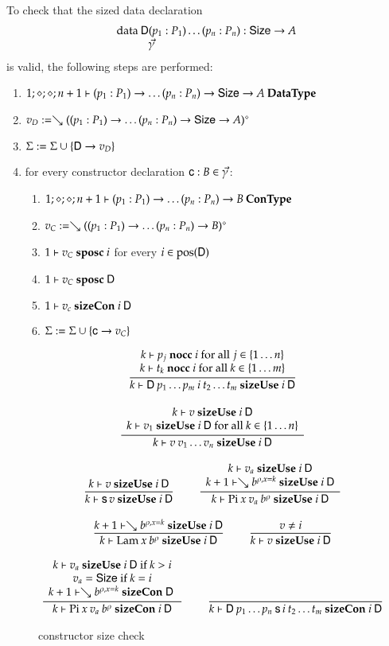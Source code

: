 To check that the sized data declaration
\[\begin{array}{l}
\data \DD ( p_1 : P_1) \ldots ( p_n : P_n) : \Size \ra A \\
\spcx \vec{\gamma}
\end{array}
\]
is valid, the following steps are performed: 
\begin{enumerate}
\item
$1;\diamond;\diamond;n+1\vdash(p_1 : P_1) \rightarrow \ldots (p_n : P_n) \rightarrow \mathsf{Size} \rightarrow A\:\mathbf{DataType}$
\item
$v_D := \searrow ((p_1 : P_1) \rightarrow \ldots (p_n : P_n) \rightarrow \mathsf{Size} \rightarrow A)^{\diamond}$
\item
$\mathrm{\Sigma} := \mathrm{\Sigma} \cup \{\mathsf{D} \rightarrow v_D\}$
\item
for every constructor declaration $\mathsf{c} : B  \in \vec{\gamma}$:
\begin{enumerate} 
\item
$1;\diamond;\diamond;n+1\vdash(p_1 : P_1) \rightarrow \ldots (p_n : P_n) \rightarrow B\:\mathbf{ConType}$
\item
$v_C := \searrow ((p_1 : P_1) \rightarrow \ldots (p_n : P_n) \rightarrow B)^{\diamond}$
\item
$1\vdash v_C\mbox{ \textbf{sposc} }i$ for every $i \in \mbox{pos}(\mathsf{D}) $ 
\item
$1\vdash v_C\mbox{ \textbf{sposc} }\mathsf{D}$
\item
$1\vdash v_c\mbox{ \textbf{sizeCon} }i\:\mathsf{D}$
\item
$\mathrm{\Sigma} := \mathrm{\Sigma} \cup \{\mathsf{c} \rightarrow v_C\}$
\end{enumerate}
\end{enumerate}

\begin{figure}[p]
\begin{gather*}
\ \dfrac{\begin{array}[b]{c}k\vdash p_j\mbox{ \textbf{nocc} }i \mbox { for all } j \in \{ 1 \ldots n\}\\k\vdash t_k\mbox{ \textbf{nocc} }i \mbox { for all } k \in \{ 1 \ldots m\}\end{array}}{k\vdash\mathsf{D} \: p_1 \ldots p_m \: i \: t_2 \ldots t_m\mbox{ \textbf{sizeUse} }i\:\mathsf{D}}
\\[2ex]
\ \dfrac{\begin{array}[b]{c}k\vdash v\mbox{ \textbf{sizeUse} }i\:\mathsf{D}\\k\vdash v_1\mbox{ \textbf{sizeUse} }i\:\mathsf{D} \mbox { for all } k \in \{ 1 \ldots n\}\end{array}}{k\vdash v \: v_1 \ldots v_n\mbox{ \textbf{sizeUse} }i\:\mathsf{D}}
\\[2ex]
\ \dfrac{k\vdash v\mbox{ \textbf{sizeUse} }i\:\mathsf{D}}{k\vdash\mathsf{s}\, v\mbox{ \textbf{sizeUse} }i\:\mathsf{D}}
\qquad
\ \dfrac{\begin{array}[b]{c}k\vdash v_a\mbox{ \textbf{sizeUse} }i\:\mathsf{D}\\k+1\vdash\searrow b^{\rho,x=k}\mbox{ \textbf{sizeUse} }i\:\mathsf{D}\end{array}}{k\vdash\mathrm{Pi} \: x \: v_a \: b^{\rho}\mbox{ \textbf{sizeUse} }i\:\mathsf{D}}
\\[2ex]
\ \dfrac{k+1\vdash\searrow b^{\rho,x=k}\mbox{ \textbf{sizeUse} }i\:\mathsf{D}}{k\vdash\mathrm{Lam} \: x \: b^{\rho}\mbox{ \textbf{sizeUse} }i\:\mathsf{D}}
\qquad
\ \dfrac{v \neq i}{k\vdash v\mbox{ \textbf{sizeUse} }i\:\mathsf{D}}
\\[2ex]
\ \dfrac{\begin{array}[b]{c}k\vdash v_a\mbox{ \textbf{sizeUse} }i\:\mathsf{D} \mbox{ if } k > i\\v_a = \mathsf{Size} \mbox { if } k = i \\k+1\vdash\searrow b^{\rho,x=k}\mbox{ \textbf{sizeCon} }\mathsf{D}\:\end{array}}{k\vdash\mathrm{Pi} \: x \: v_a \: b^{\rho}\mbox{ \textbf{sizeCon} }i\:\mathsf{D}}
\qquad
\ \dfrac{}{k\vdash\mathsf{D} \:p_1 \ldots p_n \: \mathsf{s}\, i \:t_2 \ldots t_m\mbox{ \textbf{sizeCon} }i\:\mathsf{D}}
\end{gather*}
\caption{constructor size check}
\end{figure}

